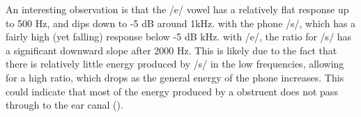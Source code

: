 An interesting observation is that the /e/ vowel has a relatively flat response up to 500 Hz, and \DIFdelbegin {}\DIFdelend dips down to -5 dB around 1kHz.  \DIFdelbegin {}\DIFdelend \DIFaddbegin {}\DIFaddend with the phone /s/, which \DIFdelbegin {}\DIFdelend has a fairly high (yet falling) response \DIFdelbegin {}\DIFdelend \DIFaddbegin {}\DIFaddend below -5 dB \DIFdelbegin {}\DIFdelend \DIFaddbegin {} kHz.  \DIFdelbegin {}\DIFdelend \DIFaddbegin {}\DIFaddend with /e/, the \DIFdelbegin {}\DIFdelend \DIFaddbegin {}\DIFaddend ratio for /s/ has a significant downward slope after 2000 Hz.  This is likely due to the fact that there is relatively little energy produced by /s/ in the low frequencies, allowing for a high ratio, which drops as the general energy of the phone increases.  This could indicate that most of the energy produced by a obstruent does not pass through to the ear canal (\cite{reinfeldt:10}).
\DIFdelbegin %
\DIFdelend \DIFaddbegin 


